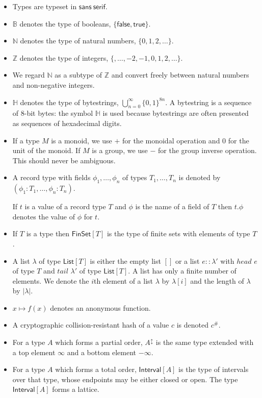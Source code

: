 \documentclass[a4paper]{article}
\newcounter{note}
\newcommand{\s}{\textsf}  %
\newcommand{\true}{\textsf{true}}
\newcommand{\false}{\textsf{false}}
\newcommand{\List}[1]{\ensuremath{\s{List}[#1]}}
\newcommand{\FinSet}[1]{\ensuremath{\s{FinSet}[#1]}}
\newcommand{\Interval}[1]{\ensuremath{\s{Interval}[#1]}}
\newcommand{\extended}[1]{#1^\updownarrow}
\newcommand\B{\ensuremath{\mathbb{B}}}
\newcommand\N{\ensuremath{\mathbb{N}}}
\newcommand\Z{\ensuremath{\mathbb{Z}}}
\renewcommand\H{\ensuremath{\mathbb{H}}}
\begin{document}
\begin{itemize}
\item Types are typeset in $\mathsf{sans~serif}$.

\item \B{} denotes the type of booleans, $\{\false, \true\}$.
\item \N{} denotes the type of natural numbers, $\{0, 1, 2, \ldots\}$.
\item \Z{} denotes the type of integers, $\{,\ldots, -2, -1, 0, 1, 2, \ldots\}$.
\item We regard $\N$ as a subtype of $\Z$ and convert freely between
  natural numbers and non-negative integers.
\item \H{} denotes the type of bytestrings, $\bigcup_{n=0}^{\infty}\{0,1\}^{8n}$.
  A bytestring is a sequence of 8-bit bytes: the symbol $\H$ is used because bytestrings are often
  presented as sequences of hexadecimal digits.

\item If a type $M$ is a monoid, we use $+$ for the monoidal operation and $0$
  for the unit of the monoid. If $M$ is a group, we use $-$ for the group
  inverse operation. This should never be ambiguous.

\item A record type with fields $\phi_1, \ldots, \phi_n$ of types $T_1,
  \ldots, T_n$ is denoted by $(\phi_1 : T_1, \ldots, \phi_n : T_n)$.

  If $t$ is a value of a record type $T$ and $\phi$ is the name
  of a field of $T$ then $t.\phi$ denotes the value of $\phi$ for
  $t$.

\item If $T$ is a type then $\FinSet{T}$ is the type of finite sets
  with elements of type $T$.

\item A list $\lambda$ of type $\List{T}$ is either the empty list
  $[]$ or a list $e :: \lambda'$ with $head$ $e$ of type $T$ and
  $tail$ $\lambda'$ of type $\List{T}$. A list has only a finite
  number of elements.  We denote the $i$th element of a list $\lambda$ by
  $\lambda[i]$ and the length of $\lambda$ by $\left|\lambda\right|$.

\item $x \mapsto f(x)$ denotes an anonymous function.

\item A cryptographic collision-resistant hash of a value $c$ is denoted $c^{\#}$.

\item For a type $A$ which forms a partial order, $\extended{A}$ is the same
  type extended with a top element $\infty$ and a bottom element $-\infty$.

\item For a type $A$ which forms a total order,  $\Interval{A}$ is the type
  of intervals over that type, whose endpoints may be either closed or open.
  The type $\Interval{A}$ forms a lattice.
\end{itemize}
\end{document}
